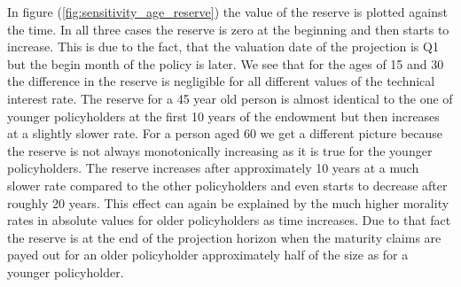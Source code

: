In figure (\ref{fig:sensitivity_age_reserve}) the value of the reserve is plotted against the time. In all three cases the reserve is zero at the beginning and then starts to increase. This is due to the fact, that the valuation date of the projection is Q1 but the begin month of the policy is later. We see that for the ages of 15 and 30 the difference in the reserve is negligible for all different values of the technical interest rate. The reserve for a 45 year old person is almost identical to the one of younger policyholders at the first 10 years of the endowment but then increases at a slightly slower rate. For a person aged 60 we get a different picture because the reserve is not always monotonically increasing as it is true for the younger policyholders. The reserve increases after approximately 10 years at a much slower rate compared to the other policyholders and even starts to decrease after roughly 20 years. This effect can again be explained by the much higher morality rates in absolute values for older policyholders as time increases. Due to that fact the reserve is at the end of the projection horizon when the maturity claims are payed out for an older policyholder approximately half of the size as for a younger policyholder.

